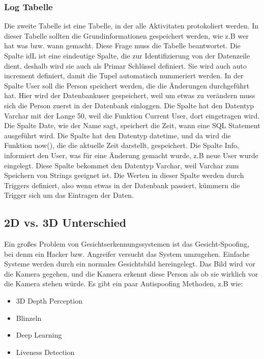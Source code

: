 \subsubsection{Log Tabelle}
Die zweite Tabelle ist eine Tabelle, in der alle Aktivitaten protokoliert werden. In dieser Tabelle sollten die Grundinformationen gespeichert werden, wie z.B wer hat was bzw. wann gemacht. Diese Frage muss die Tabelle beantwortet.
\bigbreak
Die Spalte idL ist eine eindeutige Spalte, die zur Identifizierung von der Datenzeile dient, deshalb wird sie auch als Primar Schlüssel definiert. Sie wird auch auto increment definiert, damit die Tupel automatisch nummeriert werden.
\bigbreak
In der Spalte User soll die Person speichert werden, die die Änderungen durchgeführt hat. Hier wird der Datenbankuser gespeichert, weil um etwas zu verändern muss sich die Person zuerst in der Datenbank einloggen. Die Spalte hat den Datentyp Varchar mit der Lange 50, weil die Funktion Current User, dort eingetragen wird.
\bigbreak
Die Spalte Date, wie der Name sagt, speichert die Zeit, wann eine SQL Statement ausgeführt wird. Die Spalte hat den Datentyp datetime, und da wird die Funktion now(), die die aktuelle Zeit darstellt, gespeichert.
\bigbreak
Die Spalte Info, informiert den User, was für eine Änderung gemacht wurde, z.B neue User wurde eingelegt. Diese Spalte bekommet den Datentyp Varchar, weil Varchar zum Speichern von Strings geeignet ist. Die Werten in dieser Spalte werden durch Triggers definiert, also wenn etwas in der Datenbank passiert, kümmern die Trigger sich um das Eintragen der Daten.

\subsection{2D vs. 3D Unterschied}
Ein großes Problem von Gesichtserkennungssystemen ist das Gesicht-Spoofing, bei denm ein Hacker bzw. Angreifer versucht das System umzugehen. Einfache Systeme werden durch ein normales Gesichtsbild hereingelegt. Das Bild wird vor die Kamera gegehen, und die Kamera erkennt diese Person als ob sie wirklich vor die Kamera stehen würde. Es gibt ein paar Antispoofing Methoden, z.B wie:
\begin{itemize}
    \item 3D Depth Perception
    \item Blinzeln
    \item Deep Learning
    \item Liveness Detection
\end{itemize}
